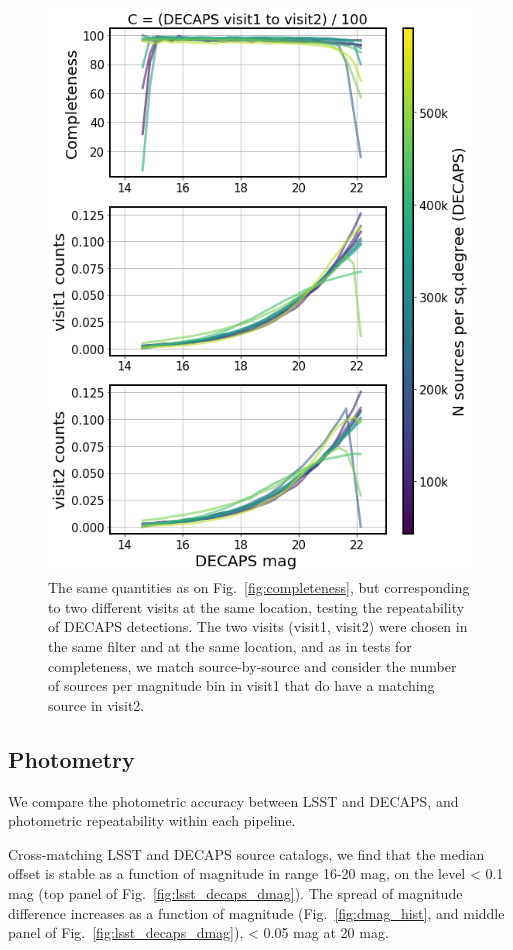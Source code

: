 \documentclass[DM,lsstdraft,toc,usenatbib,authoryear]{lsstdoc}
\begin{document}
\begin{figure}
\begin{centering}
\includegraphics[width=0.75\columnwidth]{figs/completeness_3_decaps.png}
\caption{The same quantities as on Fig.~\ref{fig:completeness}, but corresponding to two different visits at the same location, testing the repeatability of DECAPS detections. The two visits (visit1, visit2) were chosen in the same filter and at the same location, and as in tests for completeness, we match source-by-source and consider the number of sources per magnitude bin in visit1 that do have a matching source in visit2. }
\label{fig:completeness_decaps}
\end{centering}
\end{figure}





\subsection{Photometry}
\label{sec:photometry}

We compare the photometric accuracy between LSST and DECAPS, and  photometric repeatability within each pipeline.

Cross-matching LSST and DECAPS source catalogs, we find that the median offset is stable as a function of magnitude in range 16-20 mag, on the level < 0.1 mag (top panel of Fig.~\ref{fig:lsst_decaps_dmag}).
The spread of magnitude difference increases as a function of magnitude (Fig.~\ref{fig:dmag_hist}, and middle panel of Fig.~\ref{fig:lsst_decaps_dmag}), < 0.05 mag at 20 mag.
\end{document}
